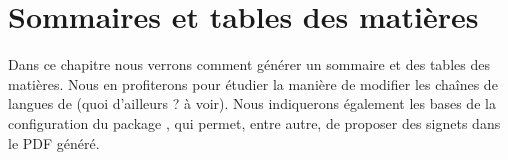 \chapter{Sommaires et tables des matières}

\begin{prealable}
Dans ce chapitre nous verrons comment générer un sommaire et des tables des matières. Nous en profiterons pour étudier la manière de modifier les chaînes de langues de (quoi d'ailleurs ? à voir). Nous indiquerons également les bases de la configuration du package , qui permet, entre autre, de proposer des signets dans le PDF généré.
\end{prealable}
